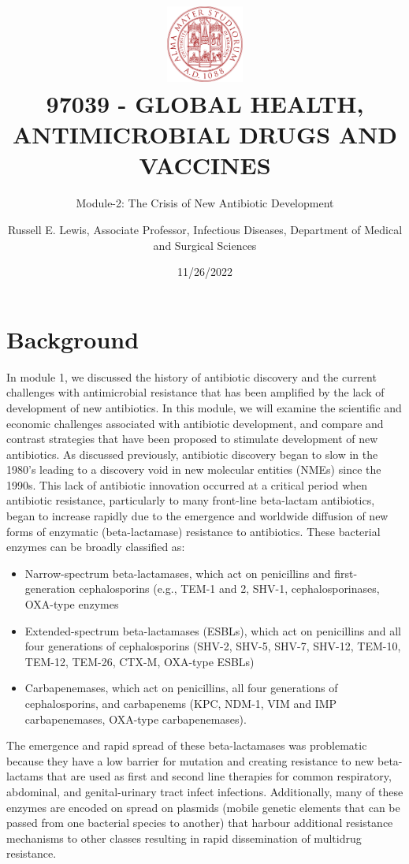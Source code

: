 \documentclass[
]{book}
\title{\includegraphics[width=1in,height=\textheight]{images/logo.png}\\
97039 - GLOBAL HEALTH, ANTIMICROBIAL DRUGS AND VACCINES}
\subtitle{Module-2: The Crisis of New Antibiotic Development}
\author{Russell E. Lewis, Associate Professor, Infectious Diseases, Department of Medical and Surgical Sciences}
\date{11/26/2022}
\providecommand{\tightlist}{%
  \setlength{\itemsep}{0pt}\setlength{\parskip}{0pt}}
\begin{document}
\maketitle

{
\setcounter{tocdepth}{1}
\tableofcontents
}
\hypertarget{background}{%
\section*{Background}\label{background}}

In module 1, we discussed the history of antibiotic discovery and the current challenges with antimicrobial resistance that has been amplified by the lack of development of new antibiotics. In this module, we will examine the scientific and economic challenges associated with antibiotic development, and compare and contrast strategies that have been proposed to stimulate development of new antibiotics.
As discussed previously, antibiotic discovery began to slow in the 1980's leading to a discovery void in new molecular entities (NMEs) since the 1990s. This lack of antibiotic innovation occurred at a critical period when antibiotic resistance, particularly to many front-line beta-lactam antibiotics, began to increase rapidly due to the emergence and worldwide diffusion of new forms of enzymatic (beta-lactamase) resistance to antibiotics. These bacterial enzymes can be broadly classified as:

\begin{itemize}
\tightlist
\item
  Narrow-spectrum beta-lactamases, which act on penicillins and first-generation cephalosporins (e.g., TEM-1 and 2, SHV-1, cephalosporinases, OXA-type enzymes
\item
  Extended-spectrum beta-lactamases (ESBLs), which act on penicillins and all four generations of cephalosporins (SHV-2, SHV-5, SHV-7, SHV-12, TEM-10, TEM-12, TEM-26, CTX-M, OXA-type ESBLs)
\item
  Carbapenemases, which act on penicillins, all four generations of cephalosporins, and carbapenems (KPC, NDM-1, VIM and IMP carbapenemases, OXA-type carbapenemases).
\end{itemize}

The emergence and rapid spread of these beta-lactamases was problematic because they have a low barrier for mutation and creating resistance to new beta-lactams that are used as first and second line therapies for common respiratory, abdominal, and genital-urinary tract infect infections. Additionally, many of these enzymes are encoded on spread on plasmids (mobile genetic elements that can be passed from one bacterial species to another) that harbour additional resistance mechanisms to other classes resulting in rapid dissemination of multidrug resistance.
\end{document}
